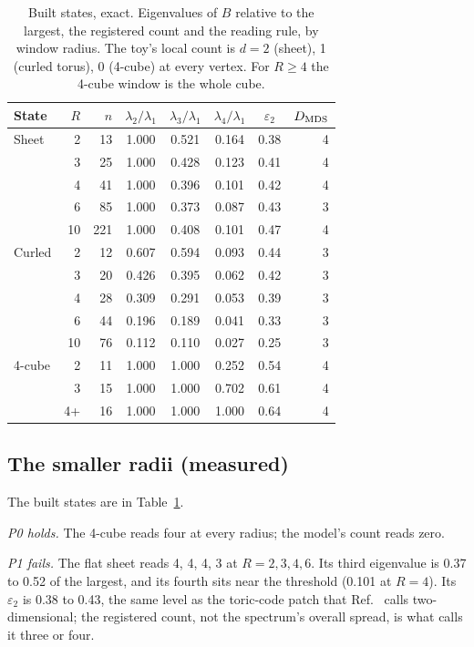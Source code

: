 \documentclass[aps,pre,10pt,twocolumn,superscriptaddress,nofootinbib]{revtex4-2}
\begin{document}
\begin{table}[t]
\caption{Built states, exact. Eigenvalues of $B$ relative to the largest, the registered count and the reading rule,
by window radius. The toy's local count is $d=2$ (sheet), 1 (curled torus), 0 (4-cube) at every vertex. For
$R\ge4$ the 4-cube window is the whole cube.}
\label{tab:built}
\begin{ruledtabular}
\begin{tabular}{lrrccccr}
State & $R$ & $n$ & $\lambda_2/\lambda_1$ & $\lambda_3/\lambda_1$ & $\lambda_4/\lambda_1$ & $\varepsilon_2$ &
$D_{\rm MDS}$\\
\hline
Sheet & 2 & 13 & 1.000 & 0.521 & 0.164 & 0.38 & 4\\
 & 3 & 25 & 1.000 & 0.428 & 0.123 & 0.41 & 4\\
 & 4 & 41 & 1.000 & 0.396 & 0.101 & 0.42 & 4\\
 & 6 & 85 & 1.000 & 0.373 & 0.087 & 0.43 & 3\\
 & 10 & 221 & 1.000 & 0.408 & 0.101 & 0.47 & 4\\
Curled & 2 & 12 & 0.607 & 0.594 & 0.093 & 0.44 & 3\\
 & 3 & 20 & 0.426 & 0.395 & 0.062 & 0.42 & 3\\
 & 4 & 28 & 0.309 & 0.291 & 0.053 & 0.39 & 3\\
 & 6 & 44 & 0.196 & 0.189 & 0.041 & 0.33 & 3\\
 & 10 & 76 & 0.112 & 0.110 & 0.027 & 0.25 & 3\\
4-cube & 2 & 11 & 1.000 & 1.000 & 0.252 & 0.54 & 4\\
 & 3 & 15 & 1.000 & 1.000 & 0.702 & 0.61 & 4\\
 & 4+ & 16 & 1.000 & 1.000 & 1.000 & 0.64 & 4\\
\end{tabular}
\end{ruledtabular}
\end{table}

\subsection{The smaller radii (measured)}

The built states are in Table~\ref{tab:built}.

\emph{P0 holds.} The 4-cube reads four at every radius; the model's count reads zero.

\emph{P1 fails.} The flat sheet reads 4, 4, 4, 3 at $R=2,3,4,6$. Its third eigenvalue is 0.37 to 0.52 of the
largest, and its fourth sits near the threshold (0.101 at $R=4$). Its $\varepsilon_2$ is 0.38 to 0.43, the same
level as the toric-code patch that Ref.~\cite{CCM16} calls two-dimensional; the registered count, not the spectrum's
overall spread, is what calls it three or four.
\end{document}
